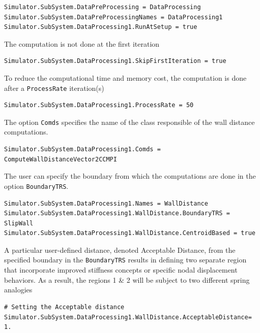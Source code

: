 \documentclass[11pt]{article}
\begin{document}
\begin{verbatim}
Simulator.SubSystem.DataPreProcessing = DataProcessing
Simulator.SubSystem.DataPreProcessingNames = DataProcessing1
Simulator.SubSystem.DataProcessing1.RunAtSetup = true
\end{verbatim}
The computation is not done at the first iteration
\begin{verbatim}
Simulator.SubSystem.DataProcessing1.SkipFirstIteration = true
\end{verbatim}
To reduce the computational time and memory cost, the computation is done after a {\tt ProcessRate} iteration(s)
\begin{verbatim}
Simulator.SubSystem.DataProcessing1.ProcessRate = 50
\end{verbatim}
The option {\tt Comds} specifies the name of the class responsible of the wall distance computations.
\begin{verbatim}
Simulator.SubSystem.DataProcessing1.Comds = ComputeWallDistanceVector2CCMPI
\end{verbatim}
The user can specify the boundary from which the computations are done in the option {\tt BoundaryTRS}.
\begin{verbatim}
Simulator.SubSystem.DataProcessing1.Names = WallDistance
Simulator.SubSystem.DataProcessing1.WallDistance.BoundaryTRS = SlipWall
Simulator.SubSystem.DataProcessing1.WallDistance.CentroidBased = true
\end{verbatim}

A particular user-defined distance, denoted Acceptable Distance, from the specified boundary in the {\tt BoundaryTRS} results in defining two separate region that incorporate improved stiffness concepts or specific nodal displacement behaviors. As a result, the regions 1 \& 2 will be subject to two different spring analogies

\begin{verbatim}
# Setting the Acceptable distance 
Simulator.SubSystem.DataProcessing1.WallDistance.AcceptableDistance= 1.
\end{verbatim}
\end{document}
